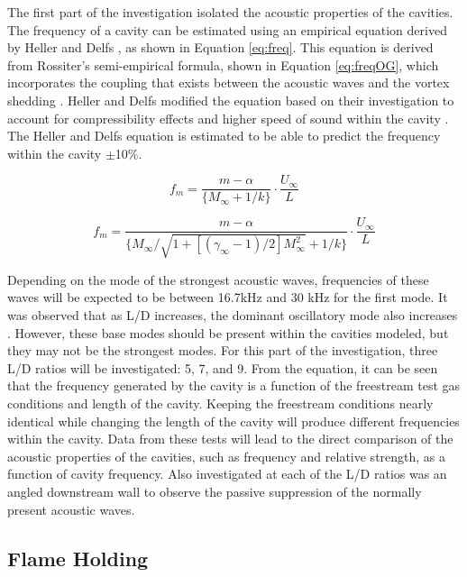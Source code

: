 The first part of the investigation isolated the acoustic properties of the cavities. The frequency of a cavity can be estimated using an empirical equation derived by Heller and Delfs \cite{heller1996letter}, as shown in Equation \ref{eq:freq}. This equation is derived from Rossiter's semi-empirical formula, shown in Equation \ref{eq:freqOG}, which incorporates the coupling that exists between the acoustic waves and the vortex shedding \cite{rossiter1964wind}. Heller and Delfs modified the equation based on their investigation to account for compressibility effects and higher speed of sound within the cavity \cite{ben2001cavity}. The Heller and Delfs equation is estimated to be able to predict the frequency within the cavity $\pm$10\%\cite{heller1996letter}.

\begin{equation}
f_m = \frac{m-\alpha}{\{M_{\infty}+1/k\}} \cdot \frac{U_\infty}{L}
\label{eq:freqOG}
\end{equation}

\begin{equation}
f_m = \frac{m-\alpha}{\{M_{\infty}/\sqrt{1+[(\gamma_{\infty}-1)/2]M_{\infty}^2}+1/k\}} \cdot \frac{U_\infty}{L}
\label{eq:freq}
\end{equation}

Depending on the mode of the strongest acoustic waves, frequencies of these waves will be expected to be between 16.7kHz and 30 kHz for the first mode. It was observed that as L/D increases, the dominant oscillatory mode also increases \cite{ben2001cavity}. However, these base modes should be present within the cavities modeled, but they may not be the strongest modes. For this part of the investigation, three L/D ratios will be investigated: 5, 7, and 9. From the equation, it can be seen that the frequency generated by the cavity is a function of the freestream test gas conditions and length of the cavity. Keeping the freestream conditions nearly identical while changing the length of the cavity will produce different frequencies within the cavity. Data from these tests will lead to the direct comparison of the acoustic properties of the cavities, such as frequency and relative strength, as a function of cavity frequency. Also investigated at each of the L/D ratios was an angled downstream wall to observe the passive suppression of the normally present acoustic waves.


\subsection{Flame Holding}

